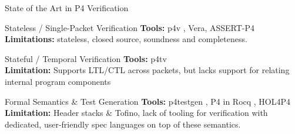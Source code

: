 \documentclass[aspectratio=169]{beamer}
\begin{document}

    



\begin{frame}{State of the Art in P4 Verification}
  \vspace{-0.5em}
  
  \begin{block}{Stateless / Single-Packet Verification}
    \small
    \textbf{Tools:} p4v \cite{10.1145/3230543.3230582}, Vera, ASSERT-P4 \cite{10.1145/3185467.3185499} \\
    \textcolor{red!70!black}{\textbf{Limitations:}} stateless, closed source, soundness and completeness.
  \end{block}
  
  \begin{block}{Stateful / Temporal Verification}
    \small
    \textbf{Tools:} p4tv \cite{10.5555/3767955.3767968} \\
    \textcolor{red!70!black}{\textbf{Limitation:}} Supports LTL/CTL across packets, but lacks support for relating internal program components
  \end{block}
  
  \begin{block}{Formal Semantics \& Test Generation}
    \small
    \textbf{Tools:} p4testgen \cite{10.1145/3603269.3604834}, P4 in Rocq \cite{10.4230/LIPIcs.ITP.2023.32}, HOL4P4 \\
    \textcolor{red!70!black}{\textbf{Limitation:}} Header stacks \& Tofino, lack of tooling for verification with dedicated, user-friendly spec languages on top of these semantics.
  \end{block}
\end{frame}
\end{document}
